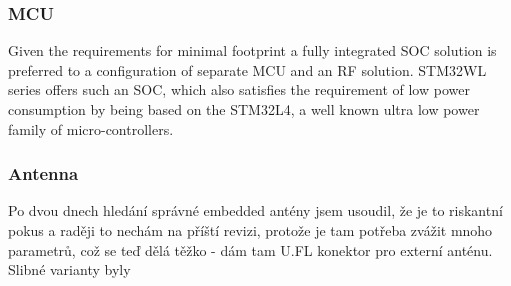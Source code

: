 \subsubsection{MCU}
Given the requirements for minimal footprint a fully integrated SOC solution is preferred to a configuration of separate MCU and an RF solution. STM32WL series offers such an SOC, which also satisfies the requirement of low power consumption by being based on the STM32L4, a well known ultra low power family of micro-controllers. 

\subsubsection{Antenna}
Po dvou dnech hledání správné embedded antény jsem usoudil, že je to riskantní pokus a raději to nechám na příští revizi, protože je tam potřeba zvážit mnoho parametrů, což se teď dělá těžko - dám tam U.FL konektor pro externí anténu. Slibné varianty byly

